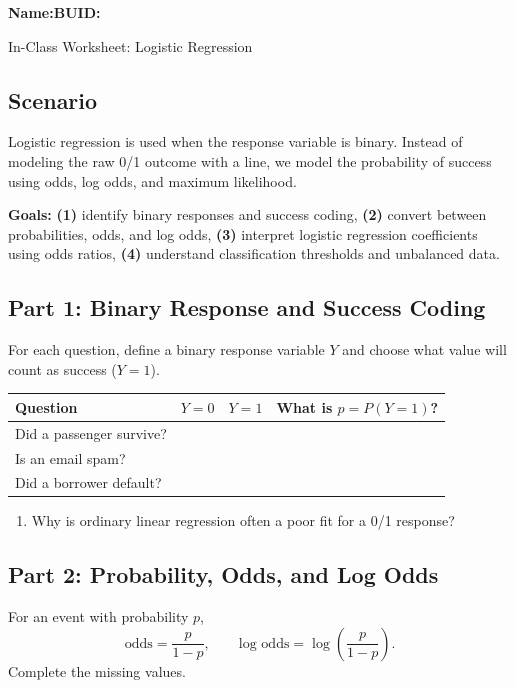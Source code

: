 \documentclass{article}
\newcommand{\blankline}[1]{\underline{\hspace{#1}}}
\begin{document}
\noindent\textbf{Name:}\blankline{2.25in}\hfill\textbf{BUID:}\blankline{1.55in}\newline

\begin{center}
 \Large In-Class Worksheet: Logistic Regression
\end{center}

\subsection*{Scenario}
Logistic regression is used when the response variable is binary. Instead of modeling the raw 0/1 outcome with a line, we model the probability of success using odds, log odds, and maximum likelihood.

\medskip
\noindent\textbf{Goals:} \textbf{(1)} identify binary responses and success coding, \textbf{(2)} convert between probabilities, odds, and log odds, \textbf{(3)} interpret logistic regression coefficients using odds ratios, \textbf{(4)} understand classification thresholds and unbalanced data.

\subsection*{Part 1: Binary Response and Success Coding}
For each question, define a binary response variable $Y$ and choose what value will count as success ($Y=1$).

\begin{center}
\renewcommand{\arraystretch}{1.45}
\begin{tabularx}{\textwidth}{p{5.2cm}p{3.2cm}p{3.2cm}X}
\toprule
\textbf{Question} & \textbf{$Y=0$} & \textbf{$Y=1$} & \textbf{What is $p=P(Y=1)$?} \\
\midrule
Did a passenger survive? & & & \\[1.8em]
Is an email spam? & & & \\[1.8em]
Did a borrower default? & & & \\
\bottomrule
\end{tabularx}
\end{center}

\begin{enumerate}[label={\bfseries (\Alph*)},itemsep=.8em]
\item Why is ordinary linear regression often a poor fit for a 0/1 response? \\[3.5em]
\end{enumerate}

\subsection*{Part 2: Probability, Odds, and Log Odds}
For an event with probability $p$,
\[
\text{odds}=\frac{p}{1-p}, \qquad \text{log odds}=\log\left(\frac{p}{1-p}\right).
\]
Complete the missing values.
\end{document}
